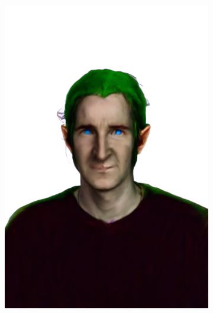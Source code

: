 \begin{figure}
\begin{subfigure}{0.18\linewidth}
        \includegraphics[width=\textwidth]{Figures/failed/igs2gs/2_render.png}

\end{subfigure}
\end{figure}
